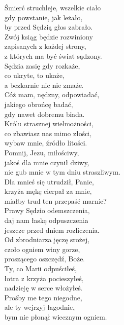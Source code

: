 \documentclass[10pt,a5paper]{mszalik}
\begin{document}
{Śmierć struchleje, wszelkie ciało\\
gdy powstanie, jak leżało,\\
by przed Sędzią głos zabrało.\\

Zwój ksiąg będzie rozwiniony\\
zapisanych z każdej strony,\\
z których ma być świat sądzony.\\

Sędzia zasię gdy rozkaże,\\
co ukryte, to ukaże,\\
a bezkarnie nic nie zmaże.\\

Cóż mam, nędzny, odpowiadać,\\
jakiego obrońcę badać,\\
gdy nawet dobremu biada.\\

Królu strasznej wielmożności,\\
co zbawiasz nas mimo złości,\\
wybaw mnie, źródło litości.\\

Pomnij, Jezu, miłościwy,\\
jakoś dla mnie czynił dziwy,\\
nie gub mnie w tym dniu straszliwym.\\

Dla mnieś się utrudził, Panie,\\
krzyża mękę cierpał za mnie,\\
miałby trud ten przepaść marnie?\\

Prawy Sędzio odemszczenia,\\
daj nam łaskę odpuszczenia\\
jeszcze przed dniem rozliczenia.\\

Od zbrodniarza jęczę srożej,\\
czoło ogniem winy gorze,\\
proszącego oszczędź, Boże.\\

Ty, co Marii odpuściłeś,\\
łotra z krzyża pocieszyłeś,\\
nadzieję w serce włożyłeś.\\

Prośby me tego niegodne,\\
ale ty wejrzyj łagodnie,\\
bym nie płonął wiecznym ogniem.\\

}
\end{document}
